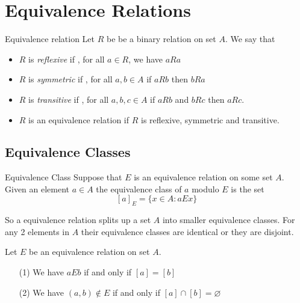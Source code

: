 \documentclass[16pt,a4paper]{article}
\theoremstyle{definition}
\begin{document}
\newpage

\section{Equivalence Relations}

\begin{defn}{Equivalence relation}{}
Let $R$ be be a binary relation on set $A$.  We say that 
\begin{itemize}
\item $R$ is \textit{reflexive} if , for all $a\in R$, we have $aRa$
\item $R$ is \textit{symmetric} if , for all $a,b \in A$  if $aRb$ then $bRa$
\item $R$ is \textit{transitive} if , for all $a,b,c \in A$ if $aRb$ and $bRc$ then $aRc$. 
\item $R$ is an equivalence relation if $R$ is reflexive, symmetric and transitive. 
\end{itemize}
\end{defn}

\subsection{Equivalence Classes}
\begin{defn}{Equivalence Class}{}
Suppose that $E$ is an equivalence relation on some set $A$. Given an element $a\in A$ the equivalence class of $a$ modulo $E$ is the set
\[[a]_E = \{x\in A : aEx\}\]
\end{defn}
So a equivalence relation splits up a set $A$ into smaller equivalence classes.  For any 2 elements in $A$ their equivalence classes are identical or they are disjoint. 
\begin{thm}{}{}
Let $E$ be an equivalence relation on set $A$. 
\begin{itemize}
\item[(1)] We have $aEb$ if and only if $[a] = [b]$
\item[(2)] We have $(a,b) \notin E$ if and only if $[a]\cap [b] = \varnothing$
\end{itemize}
\end{thm}
\end{document}
